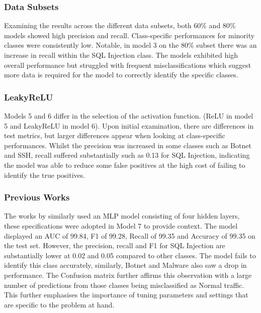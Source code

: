 \subsubsection*{Data Subsets}

Examining the results across the different data subsets, both 60\% and 80\% models showed high precision and recall. Class-specific performances for minority classes were consistently low. Notable, in model 3 on the 80\% subset there was an increase in recall within the SQL Injection class. The models exhibited high overall performance but struggled with frequent misclassifications which suggest more data is required for the model to correctly identify the specific classes.

\subsubsection*{LeakyReLU}

Models 5 and 6 differ in the selection of the activation function. (ReLU in model 5 and LeakyReLU in model 6). Upon initial examination, there are differences in test metrics, but larger differences appear when looking at class-specific performances. 
Whilst the precision was increased in some classes such as Botnet and SSH, recall suffered substantially such as 0.13 for SQL Injection, indicating the model was able to reduce some false positives at the high cost of failing to identify the true positives. 

\subsubsection*{Previous Works}
The works by \textcite{s22155633} similarly used an MLP model consisting of four hidden layers, these specifications were adopted in Model 7 to provide context. The model displayed an AUC of 99.84, F1 of 99.28, Recall of 99.35 and Accuracy of 99.35 on the test set. However, the precision, recall and F1 for SQL Injection are substantially lower at 0.02 and 0.05 compared to other classes. The model fails to identify this class accurately, similarly, Botnet and Malware also saw a drop in performance. The Confusion matrix further affirms this observation with a large number of predictions from those classes being misclassified as Normal traffic. This further emphasises the importance of tuning parameters and settings that are specific to the problem at hand. 

